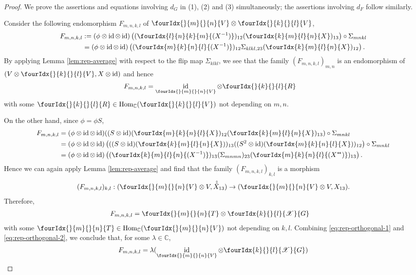 \documentclass[11pt]{article}
\DeclareMathOperator{\id}{id}
\DeclareMathOperator{\Hom}{Hom}
\newcommand{\dual}[1]{#1^{*}}
\newcommand{\C}{\mathbb{C}}
\newcommand{\Gr}[5]{\fourIdx{#2}{#4}{#3}{#5}{#1}}%
\newcommand{\Gru}[3]{\Gr{#1}{}{}{#2}{#3}}
\theoremstyle{definition}
\numberwithin{equation}{section}
\begin{document}
\begin{proof}
  We prove the assertions and equations involving $d_G$ in (1), (2)
  and (3)  simultaneously; the assertions involving $d_F$  follow similarly.

  Consider
  the following endomorphism $F_{m,n,k,l}$ of $\Gru{V}{m}{n}\otimes \Gru{V}{k}{l}$, 
  \begin{align*}
    F_{m,n,k,l}
    &:=(\phi \otimes \id \otimes \id)\left((\Gr{(X^{-1})}{l}{k}{n}{m})_{12}(\Gr{X}{k}{l}{m}{n})_{13}\right)
    \circ \Sigma_{mnkl} \\ &= (\phi \otimes \id \otimes
    \id)\left((\Gr{(X^{-1})}{m}{n}{k}{l})_{12}
      \Sigma_{klkl,23}(\Gr{X}{k}{l}{m}{n})_{12}\right).
  \end{align*}
  By applying Lemma \ref{lem:rep-average} with respect to the flip map $\Sigma_{klkl}$, we see that the family $(F_{m,n,k,l})_{m,n}$ is
  an endomorphism of $(V \otimes \Gru{V}{k}{l}, X\otimes \id)$ and hence
  \begin{align}
    F_{m,n,k,l} &= \id_{\Gru{V}{m}{n}} \otimes \Gru{R}{k}{l} \label{eq:rep-orthogonal-1}
  \end{align}
  with some $\Gru{R}{k}{l} \in \Hom_{\C}(\Gru{V}{k}{l})$ not
  depending on $m,n$. 
  
  On the other hand, since $\phi = \phi S$,
  \begin{align*}
    F_{m,n,k,l} &= (\phi \otimes \id \otimes \id)((S \otimes
    \id)(\Gr{X}{m}{n}{k}{l})_{12}(\Gr{X}{k}{l}{m}{n})_{13})
    \circ \Sigma_{mnkl} \\
    &= (\phi \otimes \id \otimes \id)\left(((S \otimes
      \id)(\Gr{X}{k}{l}{m}{n}))_{13}
      ((S^{2} \otimes \id)(\Gr{X}{m}{n}{k}{l}))_{12}\right)     \circ \Sigma_{mnkl}\\
    &= (\phi \otimes \id \otimes
    \id)\left((\Gr{(X^{-1})}{k}{l}{m}{n})_{13} (\Sigma_{mnmn})_{23}
      (\Gr{(\dual{\dual{X}{}\!})}{m}{n}{k}{l})_{13}\right).
  \end{align*}
  Hence we can again apply Lemma \ref{lem:rep-average} and
  find that the family $(F_{m,n,k,l})_{k,l}$ is a morphism \[(F_{m,n,k,l})_{k,l}:
  (\Gru{V}{m}{n} \otimes V, \hat{\hat{X}}_{13})\rightarrow (\Gru{V}{m}{n} \otimes V,
 X_{13}).\] Therefore,
  \begin{align}
    F_{m,n,k,l} &= \Gru{T}{m}{n} \otimes \Gr{G}{k}{l}{}{\mathscr{X}} \label{eq:rep-orthogonal-2}
  \end{align}
  with some $\Gru{T}{m}{n} \in \mathcal{\Hom_{\C}}(\Gru{V}{m}{n})$
  not depending on $k,l$. Combining \eqref{eq:rep-orthogonal-1} and
  \eqref{eq:rep-orthogonal-2}, we conclude that, for some $\lambda\in \C$, \[F_{m,n,k,l} = \lambda
  (\id_{\Gru{V}{m}{n}} \otimes \Gr{G}{k}{l}{}{\mathscr{X}})\]
  

\end{proof}
\end{document}
